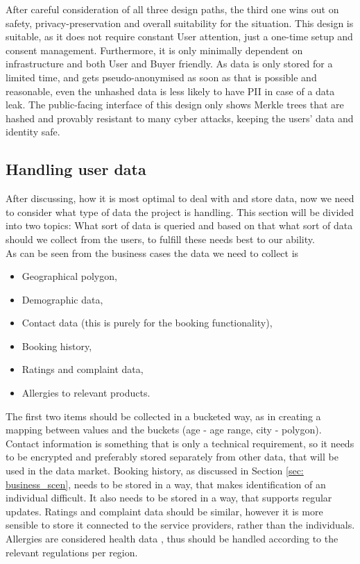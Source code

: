 \documentclass[english, 12pt, a4paper, sci, utf8, a-2b, online]{aaltothesis}
\theoremstyle{change}
\theoremstyle{theoremstyle}
\begin{document}
After careful consideration of all three design paths, the third one wins out on safety, privacy-preservation and overall suitability for the situation. This design is suitable, as it does not require constant User attention, just a one-time setup and consent management. Furthermore, it is only minimally dependent on infrastructure and both User and Buyer friendly. As data is only stored for a limited time, and gets pseudo-anonymised as soon as that is possible and reasonable, even the unhashed data is less likely to have PII in case of a data leak. The public-facing interface of this design only shows Merkle trees that are hashed and provably resistant to many cyber attacks, keeping the users' data and identity safe.

\subsection{Handling user data}
After discussing, how it is most optimal to deal with and store data, now we need to consider what type of data the project is handling. This section will be divided into two topics: What sort of data is queried and based on that what sort of data should we collect from the users, to fulfill these needs best to our ability.\\
As can be seen from the business cases the data we need to collect is 
\begin{itemize}
    \item Geographical polygon,
    \item Demographic data,
    \item Contact data (this is purely for the booking functionality),
    \item Booking history,
    \item Ratings and complaint data,
    \item Allergies to relevant products.
\end{itemize}
The first two items should be collected in a bucketed way, as in creating a mapping between values and the buckets (age - age range, city - polygon). Contact information is something that is only a technical requirement, so it needs to be encrypted and preferably stored separately from other data, that will be used in the data market. Booking history, as discussed in Section \ref{sec: business_scen}, needs to be stored in a way, that makes identification of an individual difficult. It also needs to be stored in a way, that supports regular updates. Ratings and complaint data should be similar, however it is more sensible to store it connected to the service providers, rather than the individuals. Allergies are considered health data \cite{GDPR2016}, thus should be handled according to the relevant regulations per region.
\end{document}
